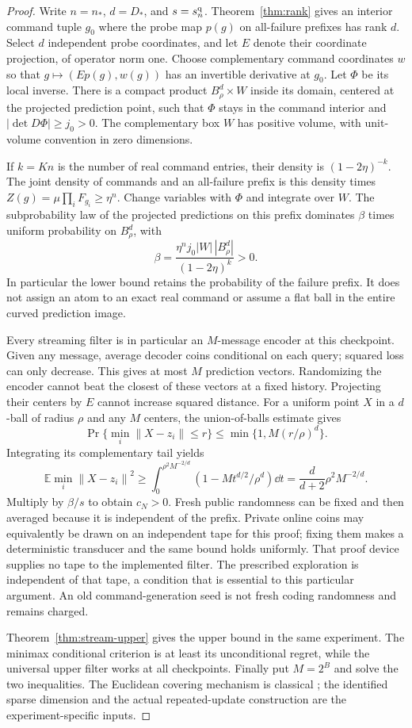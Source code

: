 \documentclass[11pt]{amsart}
\theoremstyle{definition}\newtheorem{definition}[theorem]{Definition}
\theoremstyle{remark}\newtheorem{remark}[theorem]{Remark}
\newcommand{\E}{\mathbb E}\newcommand{\Prob}{\mathbb P}
\newcommand{\norm}[1]{\left\lVert#1\right\rVert}
\begin{document}
\begin{proof}
Write $n=n_*$, $d=D_*$, and $s=s_n^{\rm q}$. Theorem~\ref{thm:rank}
gives an interior command tuple $g_0$ where the probe map $p(g)$ on
all-failure prefixes has rank $d$. Select $d$ independent probe coordinates,
and let $E$ denote their coordinate projection, of operator norm one.
Choose complementary command coordinates $w$ so that
$g\mapsto(Ep(g),w(g))$ has an invertible derivative at $g_0$.
Let $\Phi$ be its local inverse. There is a compact product
$B_\rho^d\times W$ inside its domain, centered at the projected
prediction point, such that $\Phi$ stays in the command interior and
$|\det D\Phi|\ge j_0>0$. The complementary box $W$ has positive
volume, with unit-volume convention in zero dimensions.

If $k=Kn$ is the number of real command entries, their density is
$(1-2\eta)^{-k}$. The joint density of commands and an all-failure
prefix is this density times
$Z(g)=\mu\prod_iF_{g_i}\ge\eta^n$. Change variables with $\Phi$ and
integrate over $W$. The subprobability law of the projected predictions
on this prefix dominates $\beta$ times uniform probability on
$B_\rho^d$, with
\[
 \beta=\frac{\eta^n j_0|W|\,|B_\rho^d|}{(1-2\eta)^k}>0.
\]
In particular the lower bound retains the probability of the failure
prefix. It does not assign an atom to an exact real command or assume
a flat ball in the entire curved prediction image.

Every streaming filter is in particular an $M$-message encoder at this
checkpoint. Given any message, average decoder coins conditional on each
query; squared loss can only decrease. This gives at most $M$ prediction
vectors. Randomizing the encoder cannot beat the closest of these vectors
at a fixed history. Projecting their centers by $E$ cannot increase squared
distance. For a uniform point $X$ in a $d$-ball of radius $\rho$ and any
$M$ centers, the union-of-balls estimate gives
\[
 \Pr\{\min_i\norm{X-z_i}\le r\}\le
                    \min\{1,M(r/\rho)^d\}.
\]
Integrating its complementary tail yields
\[
 \E\min_i\norm{X-z_i}^2
 \ge\int_0^{\rho^2 M^{-2/d}}
          (1-Mt^{d/2}/\rho^d)\dd t
 =\frac d{d+2}\rho^2 M^{-2/d}.
\]
Multiply by $\beta/s$ to obtain $c_N>0$. Fresh public randomness can be
fixed and then averaged because it is independent of the prefix. Private
online coins may equivalently be drawn on an independent tape for this
proof; fixing them makes a deterministic transducer and the same bound
holds uniformly. That proof device supplies no tape to the implemented
filter. The prescribed exploration is independent of that tape, a condition
that is essential to this particular argument. An old command-generation
seed is not fresh coding randomness and remains charged.

Theorem~\ref{thm:stream-upper} gives the upper bound in the same experiment.
The minimax conditional criterion is at least its unconditional regret,
while the universal upper filter works at all checkpoints. Finally put
$M=2^B$ and solve the two inequalities. The Euclidean covering mechanism
is classical \cite{GrafLuschgy}; the identified sparse dimension and the
actual repeated-update construction are the experiment-specific inputs.
\end{proof}
\end{document}
